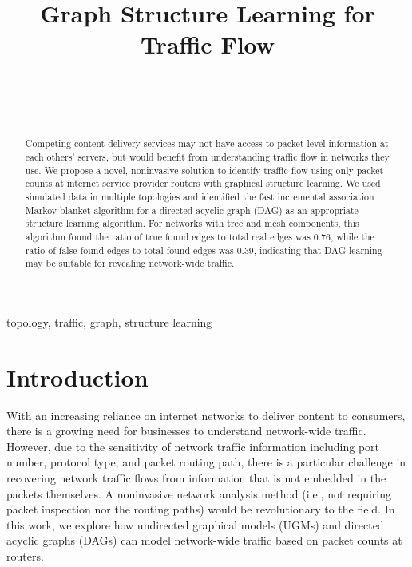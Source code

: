 \documentclass[conference]{IEEEtran}
\begin{document}
\title{Graph Structure Learning for Traffic Flow} 
\author{
\\[-9.0ex]
\and
{}
\\[-9.0ex]
}
\maketitle
\begin{abstract}
Competing content delivery services may not have access to packet-level information at each others' servers, but would benefit from understanding traffic flow in networks they use. We propose a novel, noninvasive solution to identify traffic flow using only packet counts at internet service provider routers with graphical structure learning. We used simulated data in multiple topologies and identified the fast incremental association Markov blanket algorithm for a directed acyclic graph (DAG) as an appropriate structure learning algorithm. For networks with tree and mesh components, this algorithm found the ratio of true found edges to total real edges was 0.76, while the ratio of false found edges to total found edges was 0.39, indicating that DAG learning may be suitable for revealing network-wide traffic.

\end{abstract}

\begin{IEEEkeywords}
topology, traffic, graph, structure learning 
\end{IEEEkeywords}

\section{Introduction}
With an increasing reliance on internet networks to deliver content to consumers, there is a growing need for businesses to understand network-wide traffic. However, due to the sensitivity of network traffic information including port number, protocol type, and packet routing path, there is a particular challenge in recovering network traffic flows from information that is not embedded in the packets themselves. A noninvasive network analysis method (i.e., not requiring packet inspection nor the routing paths) would be revolutionary to the field. In this work, we explore how undirected graphical models (UGMs) and directed acyclic graphs (DAGs) can model network-wide traffic based on packet counts at routers.
\end{document}
